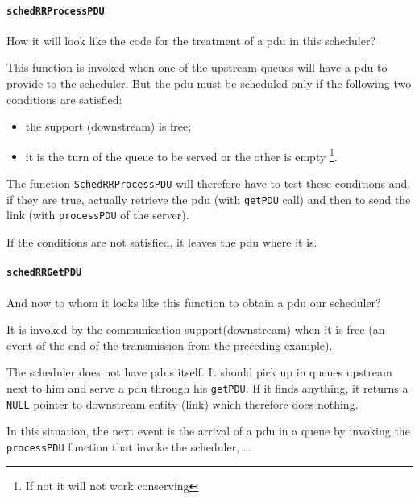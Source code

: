 %
%
%
\paragraph{\lstinline!schedRRProcessPDU!}

   How it will look like the code for the treatment of a {\sc pdu} in this scheduler?

    This function is invoked when one of the upstream queues will have a
{\sc pdu} to provide to the scheduler. But the {\sc pdu} must
be scheduled only if the following two conditions are satisfied:
\begin{itemize}
   \item the support (downstream) is free;
   \item it is the turn of the queue to be served or the other is
      empty \footnote{If not it will not work conserving}.
\end{itemize}

   The function \lstinline!SchedRRProcessPDU! will therefore have to test these
conditions and, if they are true, actually retrieve the {\sc pdu} (with \lstinline!getPDU! call) and then to send the
link (with \lstinline!processPDU! of the server).

    If the conditions are not satisfied, it leaves the {\sc pdu} where it is.

%
%
%
\paragraph{\lstinline!schedRRGetPDU!}

   And now to whom it looks like this function to obtain a {\sc pdu} our scheduler?

   It is invoked by the communication support(downstream) when
it is free (an event of the end of the transmission from the preceding
example).

   The scheduler does not have {\sc pdu}s itself. It should
pick up in queues upstream next to him and serve
a {\sc pdu} through his \lstinline!getPDU!. If
it finds anything, it returns a \lstinline!NULL! pointer to downstream entity
(link) which therefore does nothing.

   In this situation, the next event is the arrival of a
{\sc pdu} in a queue by invoking the \lstinline!processPDU! function
that invoke the scheduler, \ldots

%
